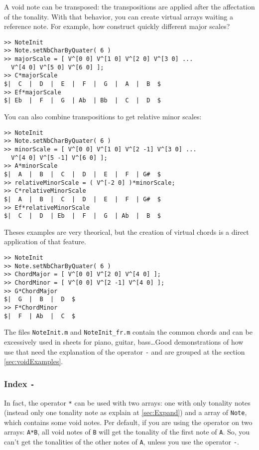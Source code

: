 \documentclass{article}
\newcommand{\note}{\lstinline!Note!\xspace}
\newcommand{\file}[1]{\texttt{#1}\xspace}
\newcommand{\noteInitFile}{\file{NoteInit.m}}
\newcommand{\noteInitFrFile}{\file{NoteInit\_fr.m}}
\begin{document}
A void note can be transposed: the transpositions are applied after the affectation of the tonality. With that behavior, you can create virtual arrays waiting a reference note. For example, how construct quickly different major scales?
\begin{lstlisting}
>> NoteInit
>> Note.setNbCharByQuater( 6 )
>> majorScale = [ V^[0 0] V^[1 0] V^[2 0] V^[3 0] ...
  V^[4 0] V^[5 0] V^[6 0] ];
>> C*majorScale
$|  C  |  D  |  E  |  F  |  G  |  A  |  B  $
>> Ef*majorScale
$| Eb  |  F  |  G  | Ab  | Bb  |  C  |  D  $
\end{lstlisting}
You can also combine transpositions to get relative minor scales:
\begin{lstlisting}
>> NoteInit
>> Note.setNbCharByQuater( 6 )
>> minorScale = [ V^[0 0] V^[1 0] V^[2 -1] V^[3 0] ...
  V^[4 0] V^[5 -1] V^[6 0] ];
>> A*minorScale
$|  A  |  B  |  C  |  D  |  E  |  F  | G#  $
>> relativeMinorScale = ( V^[-2 0] )*minorScale;
>> C*relativeMinorScale
$|  A  |  B  |  C  |  D  |  E  |  F  | G#  $
>> Ef*relativeMinorScale
$|  C  |  D  | Eb  |  F  |  G  | Ab  |  B  $
\end{lstlisting}

Theses examples are very theorical, but the creation of virtual chords is a direct application of that feature.
\begin{lstlisting}
>> NoteInit
>> Note.setNbCharByQuater( 6 )
>> ChordMajor = [ V^[0 0] V^[2 0] V^[4 0] ];
>> ChordMinor = [ V^[0 0] V^[2 -1] V^[4 0] ];
>> G*ChordMajor
$|  G  |  B  |  D  $
>> F*ChordMinor
$|  F  | Ab  |  C  $
\end{lstlisting}
The files \noteInitFile and \noteInitFrFile contain the common chords and can be excessively used in sheets for piano, guitar, bass\dots Good demonstrations of how use that need the explanation of the operator \lstinline!-! and are grouped at the section \ref{sec:voidExamples}.

\subsubsection{Index \lstinline!-!}
\label{sec:Index}

In fact, the operator \lstinline!*! can be used with two arrays: one with only tonality notes (instead only one tonality note as explain at \ref{sec:Expand}) and a array of \note, which contains some void notes. Per default, if you are using the operator on two arrays: \lstinline!A*B!, all void notes of \lstinline!B! will get the tonality of the first note of \lstinline!A!. So, you can't get the tonalities of the other notes of \lstinline!A!, unless you use the operator \lstinline!-!.
\end{document}
